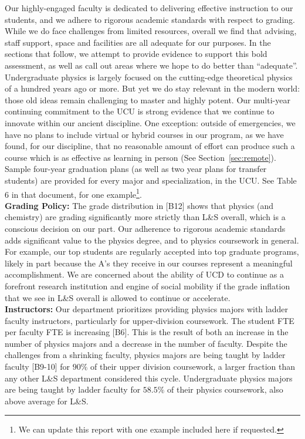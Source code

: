 \documentclass[12pt]{article}
\begin{document}
\noindent
Our highly-engaged faculty is dedicated to delivering effective
instruction to our students, and we adhere to rigorous academic
standards with respect to grading.  While we do face challenges from
limited resources, overall we find that advising, staff support, space
and facilities are all adequate for our purposes.  In the sections
that follow, we attempt to provide evidence to support this bold
assessment, as well as call out areas where we hope to do better than
``adequate''.  Undergraduate physics is largely focused on the
cutting-edge theoretical physics of a hundred years ago or more. But
yet we do stay relevant in the modern world: those old ideas remain
challenging to master and highly potent.  Our multi-year continuing
commitment to the UCU is strong evidence that we continue to innovate
within our ancient discipline.  One exception: outside of emergencies,
we have no plans to include virtual or hybrid courses in our program,
as we have found, for our discipline, that no reasonable amount of
effort can produce such a course which is as effective as learning in
person (See Section~\ref{sec:remote}).  Sample four-year graduation
plans (as well as two year plans for transfer students) are provided
for every major and specialization, in the UCU.  See Table 6 in that
document, for one example\footnote{We can update this report with one
  example included here if requested.}.\\[3pt]

\noindent
{\bf Grading Policy:} The grade distribution in [B12] shows that
physics (and chemistry) are grading significantly more strictly than
L\&S overall, which is a conscious decision on our part.  Our
adherence to rigorous academic standards adds significant value to
the physics degree, and to physics coursework in general.  For
example, our top students are regularly accepted into top graduate
programs, likely in part because the A's they receive in our courses
represent a meaningful accomplishment.  We are concerned about the
ability of UCD to continue as a forefront research institution and
engine of social mobility if the grade inflation that we see
in L\&S overall is allowed to continue or accelerate.\\[3pt]

\noindent
{\bf Instructors:} Our department prioritizes providing physics majors
with ladder faculty instructors, particularly for upper-division
coursework.  The student FTE per faculty FTE is increasing [B6].  This
is the result of both an increase in the number of physics majors and
a decrease in the number of faculty.  Despite the challenges from a
shrinking faculty, physics majors are being taught by ladder faculty
[B9-10] for $90\%$ of their upper division coursework, a larger
fraction than any other L\&S department considered this cycle.
Undergraduate physics majors are being taught by ladder faculty for
$58.5\%$ of their physics coursework, also above average for L\&S.
\end{document}
